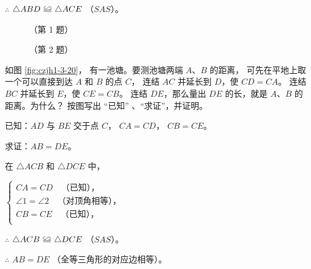 $\therefore$ \quad $\triangle ABD \quandeng \triangle ACE$ （$SAS$）。


\begin{lianxi}


\begin{figure}[htbp]
    \centering
    \begin{minipage}[b]{7cm}
        \centering
        
        \caption*{（第 1 题）}
    \end{minipage}
    \qquad
    \begin{minipage}[b]{7cm}
        \centering
        
        \caption*{（第 2 题）}
    \end{minipage}
\end{figure}



\end{lianxi}




\liti 如图 \ref{fig:czjh1-3-20}， 有一池塘。要测池塘两端 $A$、$B$ 的距离，
可先在平地上取一个可以直接到达 $A$ 和 $B$ 的点 $C$，
连结 $AC$ 并延长到 $D$，使 $CD = CA$。
连结 $BC$ 并延长到 $E$，使 $CE = CB$。
连结 $DE$，那么量出 $DE$ 的长，就是 $A$、$B$ 的距离。为什么？
按图写出 “已知” 、“求证”，并证明。

已知：$AD$ 与 $BE$ 交于点 $C$，  $CA = CD$， $CB = CE$。

求证：$AB = DE$。

\zhengming 在 $\triangle ACB$ 和 $\triangle DCE$ 中，

\hspace{2em}$\begin{cases}
    CA = CD \quad \text{（已知），} \\
    \angle 1 = \angle 2 \quad \text{（对顶角相等），} \\
    CB = CE \quad \text{（已知），} \\
\end{cases}$

$\therefore$ \quad $\triangle ACB \quandeng \triangle DCE$  （$SAS$）。

$\therefore$ \quad $AB = DE$ （全等三角形的对应边相等）。

